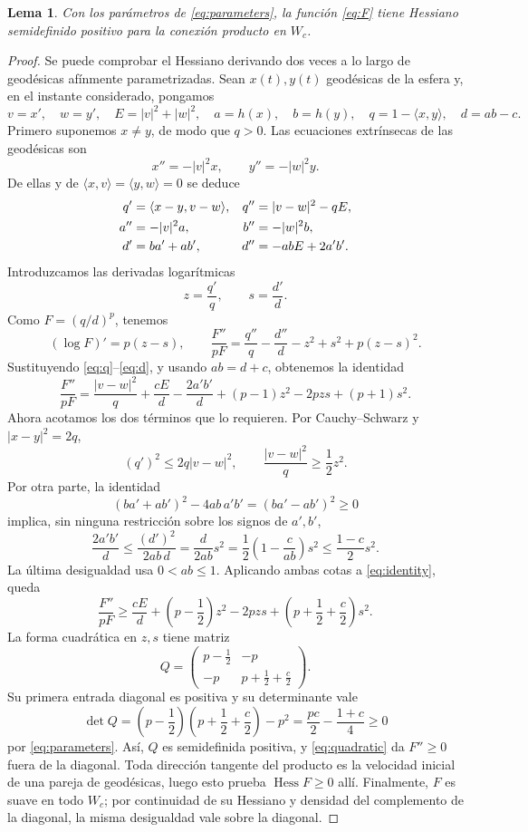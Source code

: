 \documentclass[11pt,a4paper]{article}
\newtheorem{lemma}{Lema}
\DeclareMathOperator{\Hess}{Hess}
\begin{document}
\begin{lemma}\label{lem:convex}
Con los parámetros de \eqref{eq:parameters}, la función \eqref{eq:F} tiene Hessiano semidefinido positivo para la conexión producto en $W_c$.
\end{lemma}
\begin{proof}
Se puede comprobar el Hessiano derivando dos veces a lo largo de geodésicas afínmente parametrizadas. Sean $x(t),y(t)$ geodésicas de la esfera y, en el instante considerado, pongamos
\[
 v=x',\quad w=y',\quad E=|v|^2+|w|^2,\quad
 a=h(x),\quad b=h(y),\quad q=1-\langle x,y\rangle,\quad d=ab-c.
\]
Primero suponemos $x\ne y$, de modo que $q>0$. Las ecuaciones extrínsecas de las geodésicas son
\[
 x''=-|v|^2x,\qquad y''=-|w|^2y.
\]
De ellas y de $\langle x,v\rangle=\langle y,w\rangle=0$ se deduce
\begin{align}
 q'&=\langle x-y,v-w\rangle, &
 q''&=|v-w|^2-qE,\label{eq:q}\\
 a''&=-|v|^2a, & b''&=-|w|^2b,\notag\\
 d'&=ba'+ab', & d''&=-abE+2a'b'.\label{eq:d}
\end{align}
Introduzcamos las derivadas logarítmicas
\[
 z=\frac{q'}q,\qquad s=\frac{d'}d.
\]
Como $F=(q/d)^p$, tenemos
\[
 (\log F)'=p(z-s),\qquad
 \frac{F''}{pF}=\frac{q''}q-\frac{d''}d-z^2+s^2+p(z-s)^2.
\]
Sustituyendo \eqref{eq:q}--\eqref{eq:d}, y usando $ab=d+c$, obtenemos la identidad
\begin{equation}\label{eq:identity}
 \frac{F''}{pF}=
 \frac{|v-w|^2}{q}+\frac{cE}{d}-\frac{2a'b'}d
 +(p-1)z^2-2pzs+(p+1)s^2.
\end{equation}
Ahora acotamos los dos términos que lo requieren. Por Cauchy--Schwarz y $|x-y|^2=2q$,
\[
 (q')^2\leq2q|v-w|^2,
 \qquad \frac{|v-w|^2}{q}\geq\frac12z^2.
\]
Por otra parte, la identidad
\[
 (ba'+ab')^2-4ab\,a'b'=(ba'-ab')^2\geq0
\]
implica, sin ninguna restricción sobre los signos de $a',b'$,
\[
 \frac{2a'b'}d\leq\frac{(d')^2}{2ab\,d}
 =\frac{d}{2ab}s^2
 =\frac12\left(1-\frac{c}{ab}\right)s^2
 \leq\frac{1-c}{2}s^2.
\]
La última desigualdad usa $0<ab\leq1$. Aplicando ambas cotas a \eqref{eq:identity}, queda
\begin{equation}\label{eq:quadratic}
 \frac{F''}{pF}\geq\frac{cE}{d}
 +\left(p-\frac12\right)z^2-2pzs
 +\left(p+\frac12+\frac c2\right)s^2.
\end{equation}
La forma cuadrática en $z,s$ tiene matriz
\[
 Q=\begin{pmatrix}
 p-\frac12&-p\\
 -p&p+\frac12+\frac c2
 \end{pmatrix}.
\]
Su primera entrada diagonal es positiva y su determinante vale
\[
 \det Q=\left(p-\frac12\right)
 \left(p+\frac12+\frac c2\right)-p^2
 =\frac{pc}{2}-\frac{1+c}{4}\geq0
\]
por \eqref{eq:parameters}. Así, $Q$ es semidefinida positiva, y \eqref{eq:quadratic} da $F''\geq0$ fuera de la diagonal. Toda dirección tangente del producto es la velocidad inicial de una pareja de geodésicas, luego esto prueba $\Hess F\geq0$ allí. Finalmente, $F$ es suave en todo $W_c$; por continuidad de su Hessiano y densidad del complemento de la diagonal, la misma desigualdad vale sobre la diagonal.
\end{proof}
\end{document}
